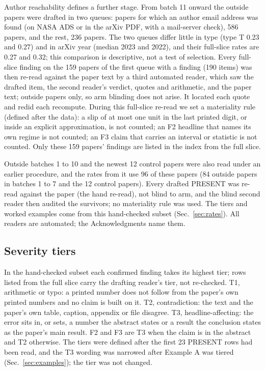 \documentclass[reprint,amsmath,amssymb,aps,superscriptaddress,nofootinbib]{revtex4-2}
\begin{document}
Author reachability defines a further stage. From batch 11 onward the outside papers were drafted in two queues: papers for which an author email address was found (on NASA ADS or in the arXiv PDF, with a mail-server check), 586 papers, and the rest, 236 papers. The two queues differ little in type (type T 0.23 and 0.27) and in arXiv year (median 2023 and 2022), and their full-slice rates are 0.27 and 0.32; this comparison is descriptive, not a test of selection. Every full-slice finding on the 159 papers of the first queue with a finding (190 items) was then re-read against the paper text by a third automated reader, which saw the drafted item, the second reader's verdict, quotes and arithmetic, and the paper text; outside papers only, so arm blinding does not arise. It located each quote and redid each recompute. During this full-slice re-read we set a materiality rule (defined after the data): a slip of at most one unit in the last printed digit, or inside an explicit approximation, is not counted; an F2 headline that names its own regime is not counted; an F3 claim that carries an interval or statistic is not counted. Only these 159 papers' findings are listed in the index from the full slice.

Outside batches 1 to 10 and the newest 12 control papers were also read under an earlier procedure, and the rates from it use 96 of these papers (84 outside papers in batches 1 to 7 and the 12 control papers). Every drafted PRESENT was re-read against the paper (the hand re-read), not blind to arm, and the blind second reader then audited the survivors; no materiality rule was used. The tiers and worked examples come from this hand-checked subset (Sec.~\ref{sec:rates}). All readers are automated; the Acknowledgments name them.

\subsection{Severity tiers}

In the hand-checked subset each confirmed finding takes its highest tier; rows listed from the full slice carry the drafting reader's tier, not re-checked. T1, arithmetic or typo: a printed number does not follow from the paper's own printed numbers and no claim is built on it. T2, contradiction: the text and the paper's own table, caption, appendix or file disagree. T3, headline-affecting: the error sits in, or sets, a number the abstract states or a result the conclusion states as the paper's main result. F2 and F3 are T3 when the claim is in the abstract and T2 otherwise. The tiers were defined after the first 23 PRESENT rows had been read, and the T3 wording was narrowed after Example A was tiered (Sec.~\ref{sec:examples}); the tier was not changed.
\end{document}
